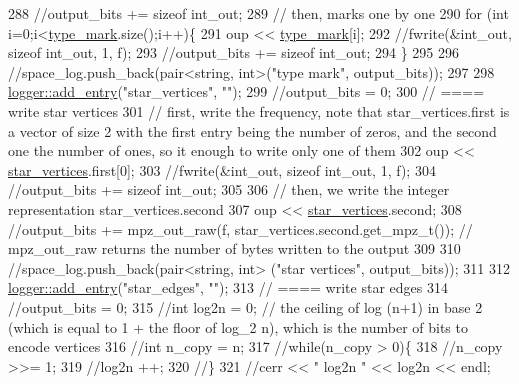 \begin{DoxyCode}
288   \textcolor{comment}{//output\_bits += sizeof int\_out;}
289   \textcolor{comment}{// then, marks one by one}
290   \textcolor{keywordflow}{for} (\textcolor{keywordtype}{int} i=0;i<\hyperlink{classmarked__graph__compressed_a86b00223525703e973415cbc9c94da68}{type\_mark}.size();i++)\{
291     oup <<  \hyperlink{classmarked__graph__compressed_a86b00223525703e973415cbc9c94da68}{type\_mark}[i];
292     \textcolor{comment}{//fwrite(&int\_out, sizeof int\_out, 1, f);}
293     \textcolor{comment}{//output\_bits += sizeof int\_out;}
294   \}
295 
296   \textcolor{comment}{//space\_log.push\_back(pair<string, int>("type mark", output\_bits));}
297 
298   \hyperlink{classlogger_a710163deb17bc81f70d53d285b8ac9ac}{logger::add\_entry}(\textcolor{stringliteral}{"star\_vertices"}, \textcolor{stringliteral}{""});
299   \textcolor{comment}{//output\_bits = 0;}
300   \textcolor{comment}{// ==== write star vertices}
301   \textcolor{comment}{// first, write the frequency, note that star\_vertices.first is a vector of size 2 with the first entry
       being the number of zeros, and the second one the number of ones, so it enough to write only one of them}
302   oup << \hyperlink{classmarked__graph__compressed_a7a4ced4586e2e353f9076bd447df5208}{star\_vertices}.first[0];
303   \textcolor{comment}{//fwrite(&int\_out, sizeof int\_out, 1, f);}
304   \textcolor{comment}{//output\_bits += sizeof int\_out;}
305 
306   \textcolor{comment}{// then, we write the integer representation star\_vertices.second}
307   oup << \hyperlink{classmarked__graph__compressed_a7a4ced4586e2e353f9076bd447df5208}{star\_vertices}.second;
308   \textcolor{comment}{//output\_bits +=  mpz\_out\_raw(f, star\_vertices.second.get\_mpz\_t()); // mpz\_out\_raw returns the number of
       bytes written to the output}
309 
310   \textcolor{comment}{//space\_log.push\_back(pair<string, int> ("star vertices", output\_bits));}
311 
312   \hyperlink{classlogger_a710163deb17bc81f70d53d285b8ac9ac}{logger::add\_entry}(\textcolor{stringliteral}{"star\_edges"}, \textcolor{stringliteral}{""});
313   \textcolor{comment}{// ==== write star edges}
314   \textcolor{comment}{//output\_bits = 0;}
315   \textcolor{comment}{//int log2n = 0; // the ceiling of log (n+1) in base 2 (which is equal to 1 + the floor of log\_2 n),
       which is the number of bits to encode vertices}
316   \textcolor{comment}{//int n\_copy = n;}
317   \textcolor{comment}{//while(n\_copy > 0)\{}
318   \textcolor{comment}{//n\_copy >>= 1;}
319   \textcolor{comment}{//log2n ++;}
320   \textcolor{comment}{//\}}
321   \textcolor{comment}{//cerr << " log2n " << log2n << endl;}

\end{DoxyCode}
